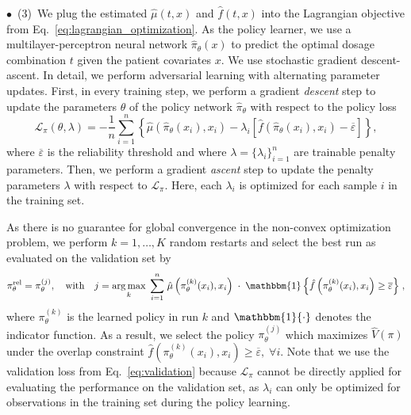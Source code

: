 \documentclass{article}
\theoremstyle{definition}
\theoremstyle{plain}
\begin{document}
$\bullet$~(3)~We plug the estimated $\hat{\mu}(t, x)$ and $\hat{f}(t, x)$ into the Lagrangian objective from Eq.~\eqref{eq:lagrangian_optimization}. As the policy learner, we use a multilayer-perceptron neural network $\hat{\pi}_{\theta}(x)$ to predict the optimal dosage combination $t$ given the patient covariates $x$. We use stochastic gradient descent-ascent. In detail, we perform adversarial learning with alternating parameter updates. First, in every training step, we perform a gradient \emph{descent} step to update the parameters $\theta$ of the policy network $\hat{\pi}_{\theta}$ with respect to the policy loss
\begin{equation}
    \mathcal{L}_{\pi}(\theta, \lambda) =  - \frac{1}{n}\sum_{i=1}^{n} \left\{ \hat{\mu} \left( \hat{\pi}_{\theta}(x_i), x_i \right) - \lambda_i \left[ \hat{f} \left( \hat{\pi}_{\theta}(x_i), x_i \right) - \overline{\varepsilon} \right] \right\},
\end{equation}
where $\overline{\varepsilon}$ is the reliability threshold and where $\lambda = \{\lambda_i\}_{i=1}^{n}$ are trainable penalty parameters. Then, we perform a gradient \emph{ascent} step to update the penalty parameters $\lambda$ with respect to $\mathcal{L_{\pi}}$. Here, each $\lambda_i$ is optimized for each sample $i$ in the training set. 

As there is no guarantee for global convergence in the non-convex optimization problem, we perform $k = 1, \ldots, K$ random restarts and select the best run as evaluated on the validation set by 
\begin{equation} \label{eq:validation}
    \pi_\theta^\text{rel} = \pi_{\theta}^{(j)}, \quad \mathrm{ with }\quad j= \underset{k}{\arg\max}\;  \sum_{i=1}^{n} \left.  \hat{\mu} \left( \pi_{\theta}^{(k)}(x_i), x_i \right)
         \; \cdot \; \mathbbm{1}\left\{  \hat{f} \left( \pi_{\theta}^{(k)}(x_i), x_i \right) \geq \overline{\varepsilon}  \right\} \right. ,
\end{equation}
where  $\pi_{\theta}^{(k)}$ is the learned policy in run $k$ and $\mathbbm{1}\{\cdot\}$ denotes the indicator function. As a result, we select the policy $\pi_{\theta}^{(j)}$ which maximizes $\hat{V}(\pi)$ under the overlap constraint  $\hat{f} \left( \pi_{\theta}^{(k)}(x_i), x_i \right) \geq \overline{\varepsilon}, \; \forall i$. Note that we use the validation loss from Eq.~\eqref{eq:validation} because $\mathcal{L}_{\pi}$ cannot be directly applied for evaluating the performance on the validation set, as $\lambda_i$ can only be optimized for observations in the training set during the policy learning. 
\end{document}
